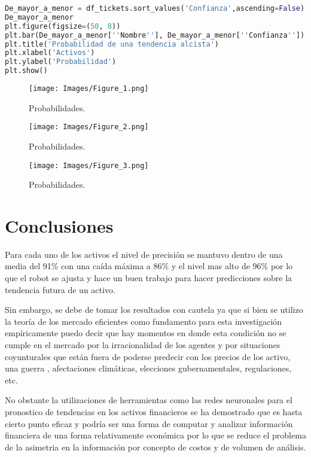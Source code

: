 \documentclass[letterpaper,12pt,oneside]{book}
\begin{document}
\begin{lstlisting}[language=Python]
De_mayor_a_menor = df_tickets.sort_values('Confianza',ascending=False)
De_mayor_a_menor
plt.figure(figsize=(50, 8))
plt.bar(De_mayor_a_menor[''Nombre''], De_mayor_a_menor[''Confianza''])
plt.title('Probabilidad de una tendencia alcista')
plt.xlabel('Activos')
plt.ylabel('Probabilidad')
plt.show()
\end{lstlisting}

\begin{figure}[ht]
	\centering
	\texttt{[image: Images/Figure\_1.png]}
	\caption{Probabilidades.}
\end{figure}


\begin{figure}[ht]
	\centering
	\texttt{[image: Images/Figure\_2.png]}
	\caption{Probabilidades.}
\end{figure}


\begin{figure}[ht]
	\centering
	\texttt{[image: Images/Figure\_3.png]}
	\caption{Probabilidades.}
\end{figure}


\chapter{Conclusiones}


Para cada uno de los activos el nivel de precisión se mantuvo dentro de una media del 91\% con una caída máxima a 86\% y el nivel mas alto de 96\% por lo que el robot se ajusta y hace un buen trabajo para hacer predicciones sobre la tendencia futura de un activo.
\vspace{0.5cm}


Sin embargo, se debe de tomar los resultados con cautela ya que si bien se utilizo la teoría de los mercado eficientes como fundamento para esta investigación empíricamente puedo decir que hay momentos en donde esta condición no se cumple en el mercado por la irracionalidad de los agentes y por situaciones coyunturales que están fuera de poderse predecir con los precios de los activo, una guerra , afectaciones climáticas, elecciones gubernamentales, regulaciones, etc.
\vspace{0.5cm}


No obstante la utilizaciones de herramientas como las redes neuronales para el pronostico de tendencias en los activos financieros se ha demostrado que es hasta cierto punto eficaz y podría ser una forma de computar y analizar información financiera de una forma relativamente económica por lo que se reduce el problema de la asimetria en la información por concepto de costos y de volumen de análisis.
\vspace{0.5cm}
\end{document}
